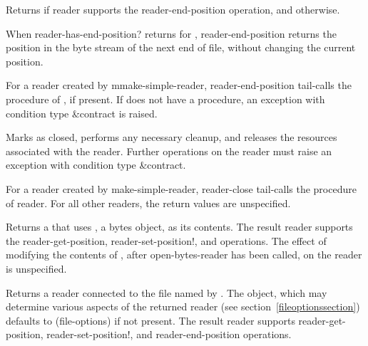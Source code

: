 \begin{entry}{%
}
   
Returns \schtrue{} if reader supports the {\cf reader-end-position}
operation, and \schfalse{} otherwise.
\end{entry}   

\begin{entry}{%
}
   
When {\cf reader-has-end-position?} returns \schtrue{} for ,
{\cf reader-end-position}
returns the position in the byte stream of the next end of file,
without changing the current position.
   
For a reader created by {\cf mmake-simple-reader}, {\cf reader-end-position} tail-calls the
 procedure of , if present. If
 does not have a  procedure, an
exception with condition type {\cf\&contract} is raised.
\end{entry}

\begin{entry}{%
}
   
Marks  as closed, performs any necessary cleanup, and
releases the resources associated with the reader. Further operations
on the reader must raise an exception with condition type
{\cf\&contract}.
   
For a reader created by {\cf make-simple-reader}, {\cf reader-close} tail-calls the
 procedure of reader.  For all other readers, the return
values are unspecified.
\end{entry}

\begin{entry}{%
}

Returns a  that uses 
, a bytes object, as its contents. The result reader supports
the {\cf reader-get-position}, {\cf reader-set-position!}, and 
operations.
The effect of modifying the contents of , after 
{\cf open-bytes-reader} has been called, on the reader is unspecified.
\end{entry}

\begin{entry}{%
}
   
Returns a reader connected to the file named by .
The  object, which may determine various aspects of the returned reader
(see section~\ref{fileoptionssection}) defaults to {\cf (file-options)} if not
present.
The result reader supports {\cf reader-get-position},
{\cf reader-set-position!}, and {\cf reader-end-position} operations.
\end{entry} 

